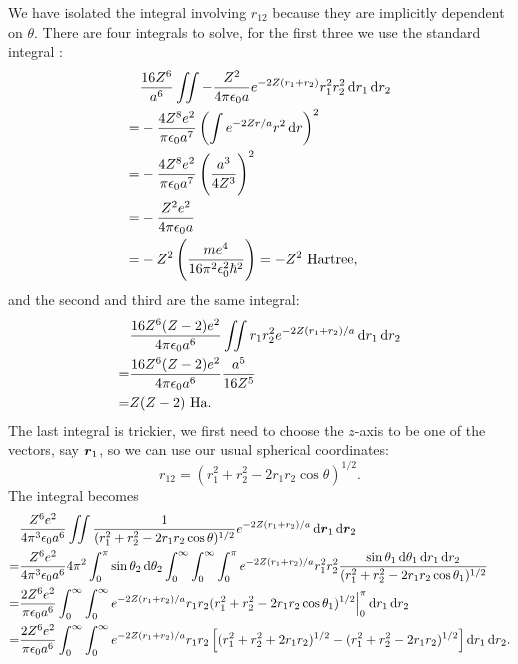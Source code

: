 We have isolated the integral involving $r_{12}$ because they are implicitly 
dependent on $\theta$. There are four integrals to solve, for the first three we 
use the standard integral :
\begin{equation}
\begin{aligned}
&\frac{16Z^6}{a^6}\iint-\frac{Z^2}{4\pi\epsilon_0 a}e^{-2Z(r_1+r_2)}r_1^2r_2^2\dif r_1\dif r_2\\
=&-\frac{4Z^8e^2}{\pi\epsilon_0 a^7}\lf(\int e^{-2Zr/a}r^2\dif r\rt)^2\\
=&-\frac{4Z^8e^2}{\pi\epsilon_0 a^7}\lf(\frac{a^3}{4Z^3}\rt)^2\\
=&-\frac{Z^2e^2}{4\pi\epsilon_0a}\\
=&-Z^2\lf(\frac{me^4}{16\pi^2\epsilon_0^2\hbar^2} \rt)=-Z^2\ \text{Hartree},
\end{aligned}
\end{equation}
and the second and third are the same integral:
\begin{equation}
\begin{aligned}
&\frac{16Z^6(Z-2)e^2}{4\pi\epsilon_0a^6}\iint r_1r_2^2e^{-2Z(r_1+r_2)/a}\dif r_1\dif r_2\\
=&\frac{16Z^6(Z-2)e^2}{4\pi\epsilon_0a^6}\frac{a^5}{16Z^5}\\
=&Z(Z-2)\ \text{Ha}.
\end{aligned}
\end{equation}
The last integral is trickier, we first need to choose the $z$-axis to be one of 
the vectors, say $\boldsymbol{r}_1$, so we can use our usual spherical coordinates: 
\begin{equation}
r_{12}=(r_1^2+r_2^2-2r_1r_2\cos\theta)^{1/2}.
\end{equation}
The integral becomes
\begin{equation}
\begin{aligned}
&\frac{Z^6e^2}{4\pi^3\epsilon_0a^6}\iint\frac{1}{(r_1^2+r_2^2-2r_1r_2\cos\theta)^{1/2}}e^{-2Z(r_1+r_2)/a}\dif\bvec{r}_1\dif\bvec{r}_2\\
=&\frac{Z^6e^2}{4\pi^3\epsilon_0a^6}4\pi^2\int^{\pi}_0\sin\theta_2\dif\theta_2\intinfp\intinfp\int^{\pi}_0e^{-2Z(r_1+r_2)/a}r_1^2r_2^2\frac{\sin\theta_1\dif\theta_1\dif r_1\dif r_2}{(r_1^2+r_2^2-2r_1r_2\cos\theta_1)^{1/2}}\\
=&\frac{2Z^6e^2}{\pi\epsilon_0a^6}\intinfp\intinfp e^{-2Z(r_1+r_2)/a}r_1r_2(r_1^2+r_2^2-2r_1r_2\cos\theta_1)^{1/2}\Big|^\pi_0\dif r_1\dif r_2\\
=&\frac{2Z^6e^2}{\pi\epsilon_0a^6}\intinfp\intinfp e^{-2Z(r_1+r_2)/a}r_1r_2\lf[(r_1^2+r_2^2+2r_1r_2)^{1/2}-(r_1^2+r_2^2-2r_1r_2)^{1/2} \rt]\dif r_1\dif r_2.
\end{aligned}
\end{equation}
